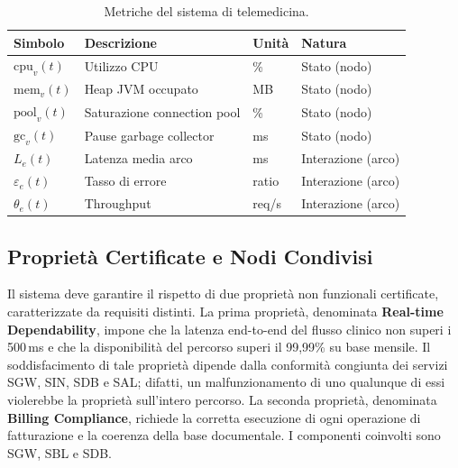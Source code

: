 \begin{table}[htbp]
\centering
\caption{Metriche del sistema di telemedicina.}
\label{tab:metriche_telemedicina}
\begin{tabular}{llll}
\toprule
\textbf{Simbolo} & \textbf{Descrizione} & \textbf{Unità} & \textbf{Natura} \\
\midrule
$\text{cpu}_v(t)$  & Utilizzo \gls{CPU}           & \%    & Stato (nodo) \\
$\text{mem}_v(t)$  & Heap \gls{JVM} occupato       & MB    & Stato (nodo) \\
$\text{pool}_v(t)$ & Saturazione connection pool   & \%    & Stato (nodo) \\
$\text{gc}_v(t)$   & Pause garbage collector       & ms    & Stato (nodo) \\
$L_e(t)$           & Latenza media arco            & ms    & Interazione (arco) \\
$\varepsilon_e(t)$ & Tasso di errore               & ratio & Interazione (arco) \\
$\theta_e(t)$      & Throughput                    & req/s & Interazione (arco) \\
\bottomrule
\end{tabular}
\end{table}

\subsection{Proprietà Certificate e Nodi Condivisi}
\label{subsec:compliance_sets}

Il sistema deve garantire il rispetto di due proprietà non funzionali certificate,
caratterizzate da requisiti distinti. La prima proprietà, denominata \textbf{Real-time
Dependability}, impone che la latenza end-to-end del flusso clinico non superi i 500\,ms e
che la disponibilità del percorso superi il 99,99\% su base mensile. Il soddisfacimento di
tale proprietà dipende dalla conformità congiunta dei servizi SGW, SIN, SDB e SAL; difatti, 
un malfunzionamento di uno qualunque di essi violerebbe la proprietà sull'intero percorso.
La seconda proprietà, denominata \textbf{Billing Compliance}, richiede
la corretta esecuzione di ogni operazione di fatturazione e la coerenza della base documentale.
I componenti coinvolti sono SGW, SBL e SDB.

